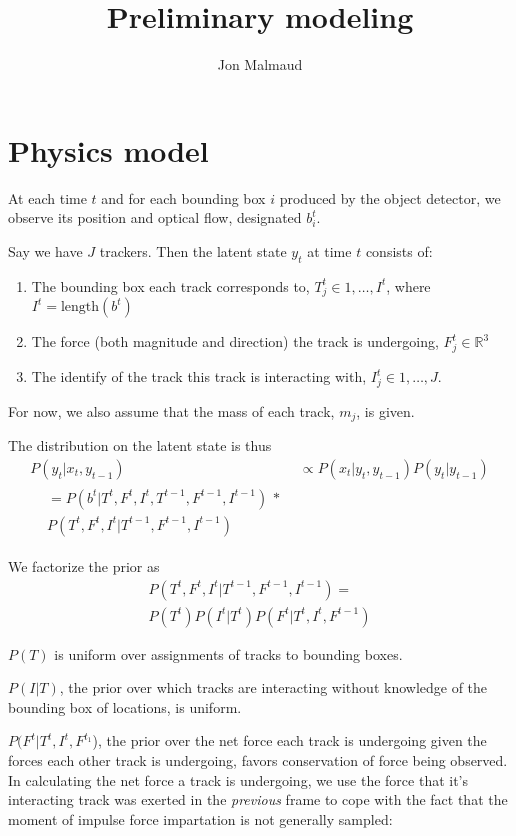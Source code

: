 \documentclass{article}
\author{Jon Malmaud}
\title{Preliminary modeling}
\begin{document}
  \maketitle
\section{Physics model}
At each time $t$ and for each bounding box $i$ produced by the object detector, we observe its position and optical flow, designated $b^t_i$.

Say we have $J$ trackers. Then the latent state $y_t$ at time $t$ consists of:

\begin{enumerate}
 \item The bounding box each track corresponds to, $T_j^t \in {1, \ldots, I^t}$, where $I^t=\text{length}(b^t)$
 \item The force (both magnitude and direction) the track is undergoing, $F_j^t \in \mathbb{R}^3$
 \item The identify of the track this track is interacting with, $I_j^t \in {1, \ldots, J}$.
\end{enumerate}

For now, we also assume that the mass of each track, $m_j$, is given.

The distribution on the latent state is thus
\begin{align}
  P(y_t|x_t,y_{t-1})&\propto P(x_t|y_t,y_{t-1})P(y_t|y_{t-1})\\
  \begin{split}
    &=P(b^t|T^t, F^t, I^t,T^{t-1},F^{t-1},I^{t-1})\,*\\
    &P(T^t,F^t,I^t|T^{t-1}, F^{t-1}, I^{t-1})
  \end{split}
\end{align}

We factorize the prior as
\begin{gather}
  P(T^t, F^t, I^t|T^{t-1}, F^{t-1}, I^{t-1})=\\
  P(T^t)P(I^t|T^t)P(F^t|T^t,I^t,F^{t-1})
\end{gather}

$P(T)$ is uniform over assignments of tracks to bounding boxes.

$P(I|T)$, the prior over which tracks are interacting without knowledge of the bounding box of locations, is uniform.

$P(F^t|T^t,I^t,F^{t_1}$), the prior over the net force each track is undergoing given the forces each other track is undergoing, favors conservation of force being observed. In calculating the net force a track is undergoing, we use the force that it's interacting track was exerted in the \emph{previous} frame to cope with the fact that the moment of impulse force impartation is not generally sampled:
\end{document}
